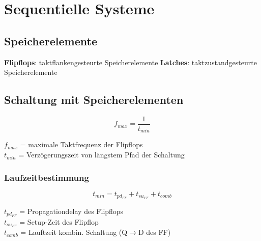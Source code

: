 \section{Sequentielle Systeme}

\subsection{Speicherelemente}
	\textbf{Flipflops}: taktflankengesteurte Speicherelemente\hspace{1cm}
	\textbf{Latches}: taktzustandgesteurte Speicherelemente   

\subsection{Schaltung mit Speicherelementen}
	\begin{minipage}[t]{6cm}
 		$$f_{max} = \frac{1}{t_{min}}$$
	\end{minipage}
	\begin{minipage}[t]{10cm}
		$f_{max}$ = maximale Taktfrequenz der Flipflops\\
		$t_{min}$ = Verzögerungszeit von längstem Pfad der Schaltung
	\end{minipage}

\subsubsection{Laufzeitbestimmung}
	\begin{minipage}[t]{6cm}
 		$$t_{min} = t_{pd_{FF}}+t_{su_{FF}}+t_{comb}$$
	\end{minipage}
	\begin{minipage}[t]{10cm}
 		$t_{pd_{FF}}$ = Propagationdelay des Flipflops\\
		$t_{su_{FF}}$ = Setup-Zeit des Flipflop\\
		$t_{comb}$ = Lauftzeit kombin. Schaltung (Q$\rightarrow$D des FF)
	\end{minipage}

%

